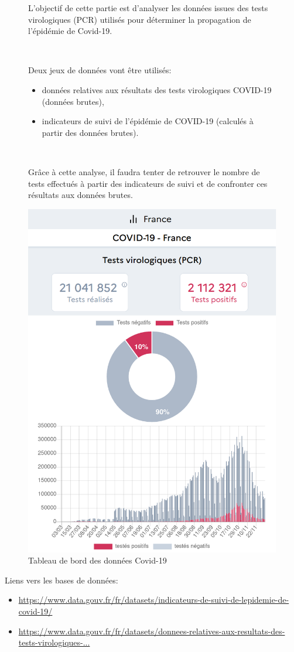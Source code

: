 \begin{figure}[ht!]
\begin{minipage}{0.5\linewidth}
L'objectif de cette partie est d'analyser les données issues des tests virologiques (PCR) utilisés pour déterminer la propagation de l'épidémie de Covid-19.

~\

Deux jeux de données vont être utilisés:
\begin{itemize}
 \item données relatives aux résultats des tests virologiques COVID-19 (données brutes),
 \item indicateurs de suivi de l’épidémie de COVID-19 (calculés à partir des données brutes).
\end{itemize}

~\

Grâce à cette analyse, il faudra tenter de retrouver le nombre de tests effectués à partir des indicateurs de suivi et de confronter ces résultats aux données brutes.
\end{minipage}\hfill
\begin{minipage}{0.48\linewidth}
  \begin{center}
  \includegraphics[width=0.5\linewidth]{img/tableau_bord}
  \caption{Tableau de bord des données Covid-19}
  \label{etagere}  \end{center}
 
\end{minipage}
\end{figure}

Liens vers les bases de données:
\begin{itemize}
 \item \href{https://www.data.gouv.fr/fr/datasets/indicateurs-de-suivi-de-lepidemie-de-covid-19/}{https://www.data.gouv.fr/fr/datasets/indicateurs-de-suivi-de-lepidemie-de-covid-19/}
 \item \href{https://www.data.gouv.fr/fr/datasets/donnees-relatives-aux-resultats-des-tests-virologiques-covid-19/}{https://www.data.gouv.fr/fr/datasets/donnees-relatives-aux-resultats-des-tests-virologiques-...}
\end{itemize}

